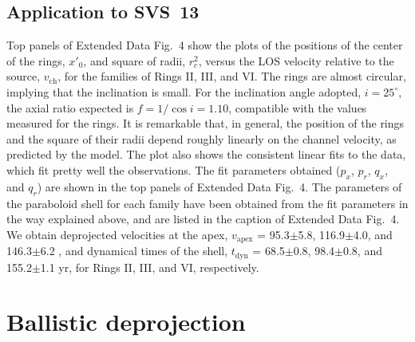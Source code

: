 \documentclass[12pt]{mythesis}
\begin{document}
\subsection{Application to SVS~13}

Top panels of Extended Data Fig.~4 show the plots of the positions of the center of the rings, $x'_0$, and square of radii, $r_c^2$, versus the LOS velocity relative to the source, $v_\mathrm{ch}$, for the families of Rings II, III, and VI.
The rings are almost circular, implying that the inclination is small.
For the inclination angle adopted, $i= 25^\circ$, the axial ratio expected is $f=1/\cos{i}=1.10$, compatible with the values measured for the rings. 
It is remarkable that, in general, the position of the rings and the square of their radii depend roughly linearly on the channel velocity, as predicted by the model.
The plot also shows the consistent linear fits to the data, which fit pretty well the observations.
The fit parameters obtained ($p_x$, $p_r$, $q_x$, and $q_r$) are shown in the top panels of Extended Data Fig.~4. 
The parameters of the paraboloid shell for each family have been obtained from the fit parameters in the way explained above, and are listed in the caption of Extended Data Fig.~4. We obtain deprojected velocities at the apex, $v_\mathrm{apex}$ = 95.3$\pm$5.8, 116.9$\pm$4.0, and 146.3$\pm$6.2 \kms, and dynamical times of the shell, $t_\mathrm{dyn}$ = 68.5$\pm$0.8, 98.4$\pm$0.8, and 155.2$\pm$1.1 yr, for Rings II, III, and VI, respectively.



\section{Ballistic deprojection}


\end{document}
